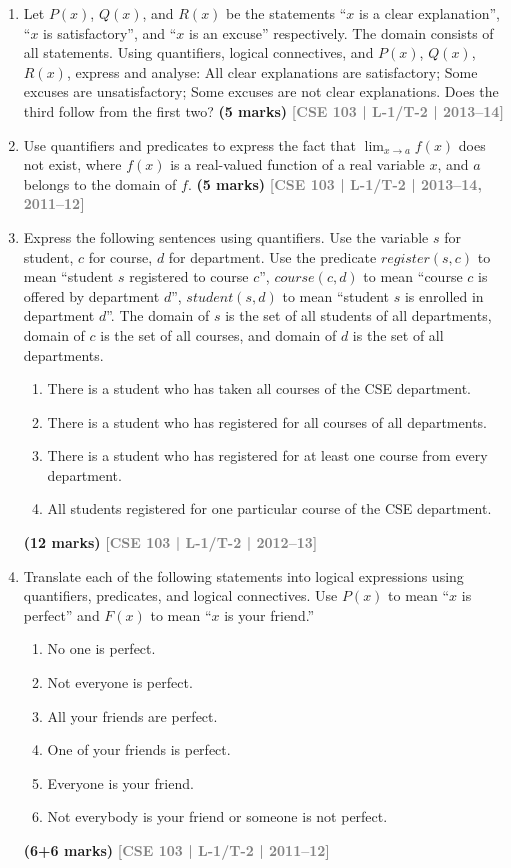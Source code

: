 \documentclass[12pt,a3paper]{article}
\newcommand{\yr}[1]{\hfill\textcolor{gray}{\small\textbf{[#1]}}}
\newcommand{\mk}[1]{\textcolor{orange!70!black}{\small\textbf{(#1 marks)}}}
\begin{document}
\begin{enumerate}
\item Let $P(x)$, $Q(x)$, and $R(x)$ be the statements ``$x$ is a clear explanation'', ``$x$ is satisfactory'', and ``$x$ is an excuse'' respectively. The domain consists of all statements. Using quantifiers, logical connectives, and $P(x)$, $Q(x)$, $R(x)$, express and analyse: All clear explanations are satisfactory; Some excuses are unsatisfactory; Some excuses are not clear explanations. Does the third follow from the first two?
\mk{5} \yr{CSE 103 | L-1/T-2 | 2013--14}

\item Use quantifiers and predicates to express the fact that $\lim_{x \to a} f(x)$ does not exist, where $f(x)$ is a real-valued function of a real variable $x$, and $a$ belongs to the domain of $f$.
\mk{5} \yr{CSE 103 | L-1/T-2 | 2013--14, 2011--12}  

\item Express the following sentences using quantifiers. Use the variable $s$ for student, $c$ for course, $d$ for department. Use the predicate $\textit{register}(s,c)$ to mean ``student $s$ registered to course $c$'', $\textit{course}(c,d)$ to mean ``course $c$ is offered by department $d$'', $\textit{student}(s,d)$ to mean ``student $s$ is enrolled in department $d$''. The domain of $s$ is the set of all students of all departments, domain of $c$ is the set of all courses, and domain of $d$ is the set of all departments.
\begin{enumerate}
  \item There is a student who has taken all courses of the CSE department.
  \item There is a student who has registered for all courses of all departments.
  \item There is a student who has registered for at least one course from every department.
  \item All students registered for one particular course of the CSE department.
\end{enumerate}
\mk{12} \yr{CSE 103 | L-1/T-2 | 2012--13}

\item Translate each of the following statements into logical expressions using quantifiers, predicates, and logical connectives. Use $P(x)$ to mean ``$x$ is perfect'' and $F(x)$ to mean ``$x$ is your friend.''
\begin{enumerate}
  \item No one is perfect.
  \item Not everyone is perfect.
  \item All your friends are perfect.
  \item One of your friends is perfect.
  \item Everyone is your friend.
  \item Not everybody is your friend or someone is not perfect.
\end{enumerate}
\mk{6+6} \yr{CSE 103 | L-1/T-2 | 2011--12}


\end{enumerate}
\end{document}
